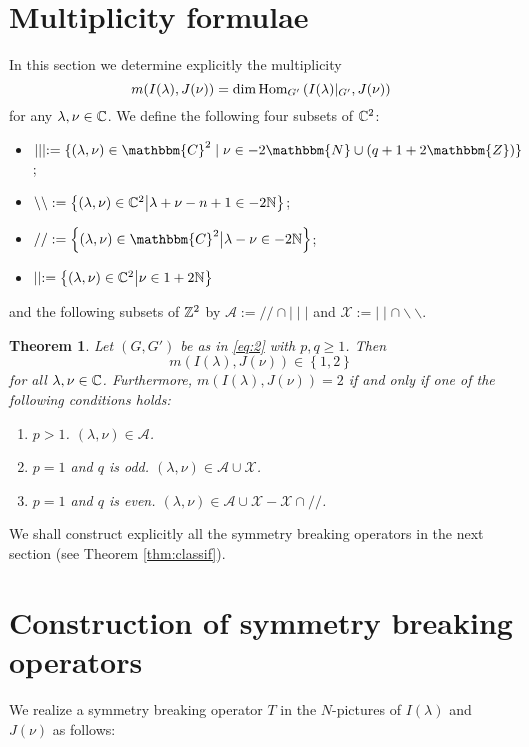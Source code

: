 \documentclass[reqno,12pt]{pja00} %
\newcommand{\assign}{:=}
\newtheorem{theorem}{Theorem}
\newcommand{\Hom}{\mbox{\normalfont Hom}}
\theoremstyle{definition}
\theoremstyle{exampstyle} \newtheorem{examp}[theorem]{Theorem}
\begin{document}
\section{Multiplicity formulae}
In this section we determine explicitly the multiplicity
\begin{equation*}
	m(I(\lambda),J(\nu))=\dim\Hom_{G'}\left( I(\lambda)\kern-0.1cm\mid_{G'},J(\nu) \right)
\end{equation*}
for any $\lambda,\nu\in\mathbb{C}$. We define the following four subsets of $\mathbb{C}^2$:
\begin{itemize}
	\item $\mid \mid \mid \assign \{ (\lambda, \nu) \in \mathbbm{C}^2 \mid \nu \in
	- 2\mathbbm{N} \cup (q + 1 + 2\mathbbm{Z}) \}$;
\item $\backslash\backslash:=\left\{(\lambda,\nu)\in\mathbb{C}^2\big| \lambda+\nu-n+1\in-2\mathbb{N}\right\}$;
\item $/ / \assign\mysetn{(\lambda, \nu) \in \mathbbm{C}^2}{\lambda - \nu \in-2\N }$;
\item $\mid\mid:=\left\{(\lambda,\nu)\in\mathbb{C}^2\big| \nu\in1+2\mathbb{N}\right\}$
\end{itemize}
and the following subsets of $\mathbb{Z}^2$ by $\mathcal{A}:=//\cap\mid\mid\mid$ and $\mathcal{X}:=\mid\mid\cap\backslash\backslash$.
\begin{theorem}
	Let $(G,G')$ be as in \eqref{eq:2} with $p,q\ge1$. Then\begin{equation*}
		m(I(\lambda),J(\nu))\in\left\{ 1,2 \right\}
	\end{equation*}
	for all $\lambda,\nu\in\mathbb{C}$. Furthermore, $m(I(\lambda),J(\nu))=2$ if and only if one of the following conditions holds:
	\begin{enumerate}[C{a}se 1.]
		\item $p>1$. $(\lambda,\nu)\in\mathcal{A}$.
		\item $p=1$ and $q$ is odd. $(\lambda,\nu)\in\mathcal{A}\cup\mathcal{X}$.
		\item $p=1$ and $q$ is even. $(\lambda,\nu)\in\mathcal{A}\cup\mathcal{X}-\mathcal{X}\cap//$.
	\end{enumerate}
	\label{thm:multiplicity}
\end{theorem}
We shall construct explicitly all the symmetry breaking operators in the next section (see Theorem \ref{thm:classif}).
\section{Construction of symmetry breaking operators}
We realize a symmetry breaking operator $T$ in the $N$-pictures of $I(\lambda)$ and $J(\nu)$ as follows:
\end{document}
